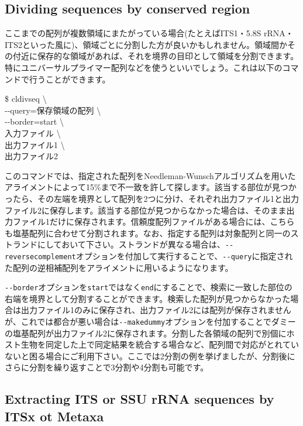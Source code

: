 \documentclass[titlepage,10pt,a4paper,english]{jsbook}
\newenvironment{cmd}{\begin{oframed}\raggedright\ttfamily\footnotesize\setlength{\baselineskip}{1.4em}}{\end{oframed}\vspace{-1em}}
\begin{document}
\subsection{Dividing sequences by conserved region}

ここまでの配列が複数領域にまたがっている場合(たとえばITS1・5.8S rRNA・ITS2といった風に)、領域ごとに分割した方が良いかもしれません。領域間かその付近に保存的な領域があれば、それを境界の目印として領域を分割できます。特にユニバーサルプライマー配列などを使うといいでしょう。これは以下のコマンドで行うことができます。
\begin{cmd}
\$ cldivseq {\textbackslash}\\
{-}{-}query=保存領域の配列 {\textbackslash}\\
{-}{-}border=start {\textbackslash}\\
入力ファイル {\textbackslash}\\
出力ファイル1 {\textbackslash}\\
出力ファイル2
\end{cmd}
このコマンドでは、指定された配列をNeedleman-Wunschアルゴリズムを用いたアライメントによって15\%まで不一致を許して探します。該当する部位が見つかったら、その左端を境界として配列を2つに分け、それぞれ出力ファイル1と出力ファイル2に保存します。該当する部位が見つからなかった場合は、そのまま出力ファイル1だけに保存されます。信頼度配列ファイルがある場合には、こちらも塩基配列に合わせて分割されます。なお、指定する配列は対象配列と同一のストランドにしておいて下さい。ストランドが異なる場合は、\texttt{{-}{-}reversecomplement}オプションを付加して実行することで、\texttt{{-}{-}query}に指定された配列の逆相補配列をアライメントに用いるようになります。

\texttt{{-}{-}border}オプションを\texttt{start}ではなく\texttt{end}にすることで、検索に一致した部位の右端を境界として分割することができます。検索した配列が見つからなかった場合は出力ファイル1のみに保存され、出力ファイル2には配列が保存されませんが、これでは都合が悪い場合は\texttt{{-}{-}makedummy}オプションを付加することでダミーの塩基配列が出力ファイル2に保存されます。分割した各領域の配列で別個にホスト生物を同定した上で同定結果を統合する場合など、配列間で対応がとれていないと困る場合にご利用下さい。ここでは2分割の例を挙げましたが、分割後にさらに分割を繰り返すことで3分割や4分割も可能です。

\subsection{Extracting ITS or SSU rRNA sequences by ITSx ot Metaxa}
\end{document}
